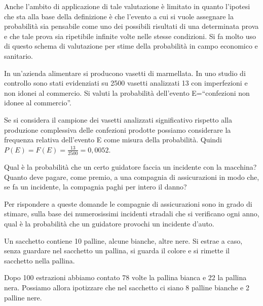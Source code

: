 Anche l'ambito di applicazione di tale valutazione è limitato in quanto 
l'ipotesi che sta alla base della definizione è che l'evento a cui si vuole 
assegnare la probabilità sia pensabile come uno dei possibili risultati di una 
determinata prova e che tale prova sia ripetibile infinite volte nelle stesse 
condizioni.
Si fa molto uso di questo schema di valutazione per stime della probabilità in 
campo economico e sanitario.

\begin{exrig}
\begin{esempio}
In un'azienda alimentare si producono vasetti di marmellata. In uno studio di 
controllo sono stati evidenziati su 2500 vasetti analizzati 13 con imperfezioni 
e non idonei al commercio. Si valuti la probabilità dell'evento E=``confezioni 
non idonee al commercio''.

Se si considera il campione dei vasetti analizzati significativo rispetto alla 
produzione complessiva delle confezioni prodotte possiamo considerare la 
frequenza relativa dell'evento E come misura della probabilità. Quindi 
$P(E)=F(E)=\frac{13}{2500}=0,0052$.
\end{esempio}

\begin{esempio}
Qual è la probabilità che un certo guidatore faccia un incidente con la 
macchina? Quanto deve pagare, come premio, a una compagnia di assicurazioni in 
modo che, se fa un incidente, la compagnia paghi per intero il danno?

Per rispondere a queste domande le compagnie di assicurazioni sono in grado di 
stimare, sulla base dei numerosissimi incidenti stradali che si verificano ogni 
anno, qual è la probabilità che un guidatore provochi un incidente d'auto.
\end{esempio}

\begin{esempio}
Un sacchetto contiene 10 palline, alcune bianche, altre nere. Si estrae a caso, 
senza guardare nel sacchetto un pallina, si guarda il colore e si rimette il 
sacchetto nella pallina.

Dopo 100 estrazioni abbiamo contato 78 volte la pallina bianca e 22 la pallina 
nera. Possiamo allora ipotizzare che nel sacchetto ci siano 8 palline bianche e 
2 palline nere.
\end{esempio}
\end{exrig}


